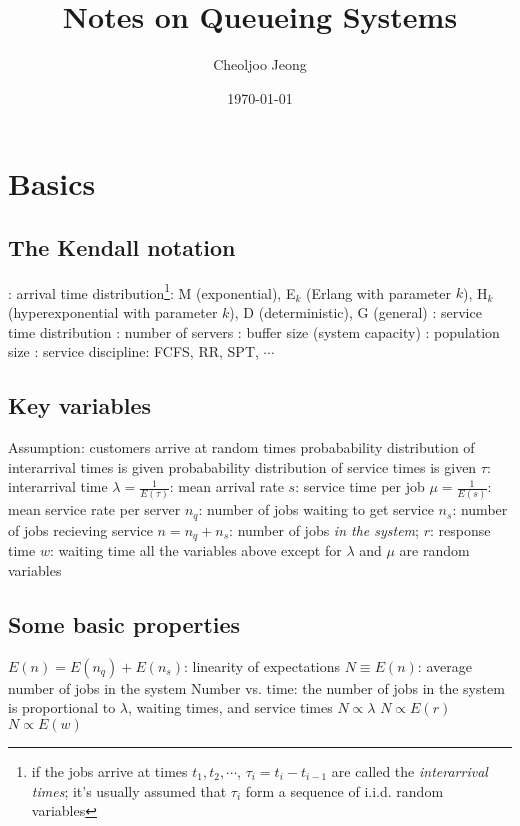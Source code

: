 \documentclass{myart}
\begin{document}
\title{\large\bf Notes on Queueing Systems}
\author{\normalsize Cheoljoo Jeong}
\date{\normalsize\today}
\maketitle


\section{Basics}
\subsection{The Kendall notation}
\bit
\w {}
	\bit
	\w {}: arrival time distribution\footnote{if the jobs 
	arrive at times $t_1, t_2, \cdots$,
	$\tau_i = t_i - t_{i-1}$ are called the {\em interarrival times\/};
	it's usually assumed that $\tau_i$ form a sequence of i.i.d. 
	random variables}:
		M (exponential),
		E$_k$ (Erlang with parameter $k$), 
		H$_k$ (hyperexponential with parameter $k$),
		D (deterministic), G (general)
	\w {}: service time distribution
	\w {}: number of servers
	\w {}: buffer size (system capacity)
	\w {}: population size
	\w {}: service discipline:
		FCFS, RR, SPT, $\cdots$
	\eit
\eit

\subsection{Key variables}
\bit
\w Assumption:
	\bit
	\w customers arrive at random times
	\w probabability distribution of interarrival times is given
	\w probabability distribution of service times is given
	\eit
\w $\tau$: interarrival time
\w $\lambda = \frac{1}{E(\tau)}$: mean arrival rate
\w $s$: service time per job
\w $\mu = \frac{1}{E(s)}$: mean service rate per server
\w $n_q$: number of jobs waiting to get service
\w $n_s$: number of jobs recieving service
\w $n = n_q + n_s$: number of jobs {\em in the system\/};  
\w $r$: response time
\w $w$: waiting time
\w all the variables above except for $\lambda$ and $\mu$ are
	random variables
\eit

\subsection{Some basic properties}
\bit
\w $E(n) = E(n_q) + E(n_s)$: linearity of expectations
\w $N \equiv E(n)$: average number of jobs in the system
\w Number vs. time: the number of jobs in the system is proportional
	to $\lambda$, waiting times, and service times
	\bit
	\w $N \propto \lambda$
	\w $N \propto E(r)$
	\w $N \propto E(w)$
	\eit
\eit
\end{document}
